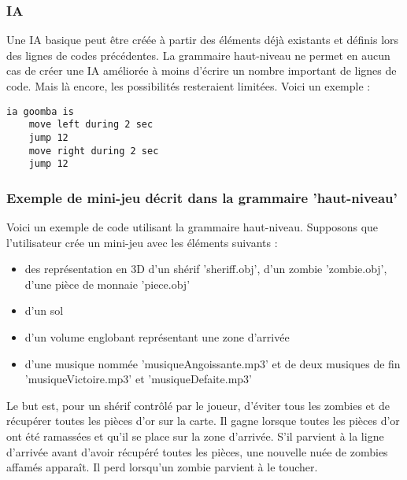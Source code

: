 \subsubsection{IA}

Une IA basique peut être créée à partir des éléments déjà existants et définis lors des lignes de codes précédentes. 
La grammaire haut-niveau ne permet en aucun cas de créer une IA améliorée à moins d'écrire un nombre important de lignes de code. 
Mais là encore, les possibilités resteraient limitées. Voici un exemple : 
\begin{lstlisting}[language=GameGrammar]
ia goomba is 
	move left during 2 sec
	jump 12
	move right during 2 sec
	jump 12
\end{lstlisting}

\subsubsection{Exemple de mini-jeu décrit dans la grammaire 'haut-niveau'}

Voici un exemple de code utilisant la grammaire haut-niveau.
Supposons que l'utilisateur crée un mini-jeu avec les éléments suivants :
\begin{itemize}
\item des représentation en 3D d'un shérif 'sheriff.obj', d'un zombie 'zombie.obj', d'une pièce de monnaie 'piece.obj'
\item d'un sol 
\item d'un volume englobant représentant une zone d'arrivée
\item d'une musique nommée 'musiqueAngoissante.mp3' et de deux musiques de fin 'musiqueVictoire.mp3' et 'musiqueDefaite.mp3'
\end{itemize}

Le but est, pour un shérif contrôlé par le joueur, d'éviter tous les zombies et de récupérer toutes les pièces d'or 
sur la carte. 
Il gagne lorsque toutes les pièces d'or ont été ramassées et qu'il se place sur la zone d'arrivée.
S'il parvient à la ligne d'arrivée avant d'avoir récupéré toutes les pièces, une nouvelle nuée de zombies affamés apparaît.
Il perd lorsqu'un zombie parvient à le toucher.

